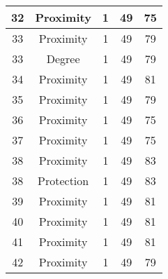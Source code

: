 \documentclass[results.tex]{subfiles}
\begin{document}
\begin{center}
\begin{tabular}{| c || c | c | c | c |}
            \hline
            32                      & Proximity                    & 1                      & 49                      & 75                   \\
            \hline
            33                      & Proximity                    & 1                      & 49                      & 79                   \\
            \hline
            33                      & Degree                       & 1                      & 49                      & 79                   \\
            \hline
            34                      & Proximity                    & 1                      & 49                      & 81                   \\
            \hline
            35                      & Proximity                    & 1                      & 49                      & 79                   \\
            \hline
            36                      & Proximity                    & 1                      & 49                      & 75                   \\
            \hline
            37                      & Proximity                    & 1                      & 49                      & 75                   \\
            \hline
            38                      & Proximity                    & 1                      & 49                      & 83                   \\
            \hline
            38                      & Protection                   & 1                      & 49                      & 83                   \\
            \hline
            39                      & Proximity                    & 1                      & 49                      & 81                   \\
            \hline
            40                      & Proximity                    & 1                      & 49                      & 81                   \\
            \hline
            41                      & Proximity                    & 1                      & 49                      & 81                   \\
            \hline
            42                      & Proximity                    & 1                      & 49                      & 79                   \\

\end{tabular}
\end{center}
\end{document}
